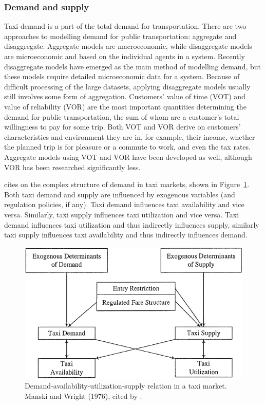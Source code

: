\subsubsection{Demand and supply}
\label{sec:literature:taxis:demand}

Taxi demand is a part of the total demand for transportation. There are two
approaches to modelling demand for public transportation: aggregate and
disaggregate. Aggregate models are macroeconomic, while disaggregate models are
microeconomic and based on the individual agents in a system. Recently
disaggregate models have emerged as the main method of modelling demand, but
these models require detailed microeconomic data for a system. Because of
difficult processing of the large datasets, applying disaggregate models
usually still involves some form of aggregation. Customers' value of time (VOT)
and value of reliability (VOR) are the most important quantities determining
the demand for public transportation, the sum of whom are a customer's total
willingness to pay for some trip. Both VOT and VOR derive on customers'
characteristics and environment they are in, for example, their income, whether
the planned trip is for pleasure or a commute to work, and even the tax rates.
Aggregate models using VOT and VOR have been developed as well, although VOR
has been researched significantly less. \parencite{Small2007taxi+urban}

\textcite{Yang2002taxi+demand} cites \textcite{Manski1967taxi+demand} on the
complex structure of demand in taxi markets, shown in Figure~\ref{figure:taxi}.
Both taxi demand and supply are influenced by exogenous variables (and
regulation policies, if any). Taxi demand influences taxi availability and vice
versa. Similarly, taxi supply influences taxi utilization and vice versa. Taxi
demand influences taxi utilization and thus indirectly influences supply,
similarly taxi supply influences taxi availability and thus indirectly
influences demand.

\begin{figure}
  \begin{center}
    \includegraphics{../figures/taxi_demand}
    \caption{
      Demand-availability-utilization-supply relation in a taxi market. Manski 
      and Wright (1976), cited by \textcite{Yang2002taxi+demand}.
      \label{figure:taxi}
    }
  \end{center}
\end{figure}

